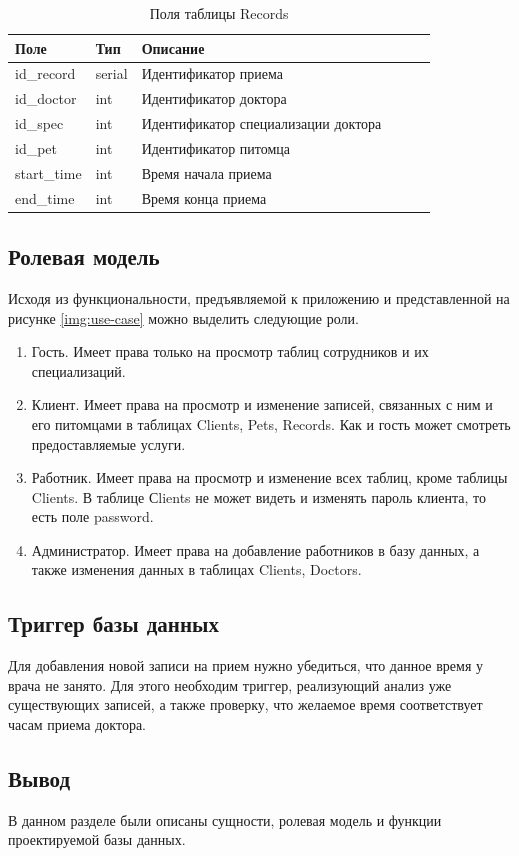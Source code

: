 \begin{table}[hbtp]
		\caption{\label{tab:records}Поля таблицы Records}
	\begin{center}
		\begin{tabular}{|l|l|l|l|l|l|}
			\hline {Поле} & {Тип} & {Описание}  \\ \hline
			id\_record  & serial & Идентификатор приема   \\ \hline
			id\_doctor & int & Идентификатор доктора  \\ \hline
			id\_spec & int & Идентификатор специализации доктора  \\ \hline
			id\_pet & int & Идентификатор питомца   \\ \hline
			start\_time & int & Время начала приема\\ \hline
			end\_time & int & Время конца приема\\ \hline
		\end{tabular}
	\end{center}
\end{table}

\pagebreak

\subsection{Ролевая модель}
Исходя из функциональности, предъявляемой к приложению и представленной на рисунке \ref{img:use-case} можно выделить следующие роли.
\begin{enumerate}[label=\arabic*)]
	\item Гость. Имеет права только на просмотр таблиц сотрудников и их специализаций.
	\item Клиент. Имеет права на просмотр и изменение записей, связанных с ним и его питомцами в таблицах Clients, Pets, Records. Как и гость может смотреть предоставляемые услуги.
	\item Работник. Имеет права на просмотр и изменение всех таблиц, кроме таблицы Clients. В таблице Сlients не может видеть и изменять пароль клиента, то есть поле password.  
	\item Администратор. Имеет права на добавление работников в базу данных, а также изменения данных в таблицах Clients, Doctors.
\end{enumerate}

\subsection{Триггер базы данных}

Для добавления новой записи на прием нужно убедиться, что данное время у врача не занято. Для этого необходим триггер, реализующий анализ уже существующих записей, а также проверку, что желаемое время соответствует часам приема доктора.

\subsection*{Вывод}
В данном разделе были описаны сущности, ролевая модель и функции проектируемой базы данных.